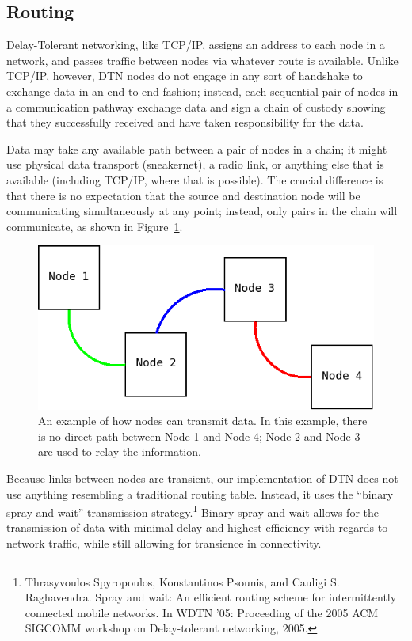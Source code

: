 \documentclass[12pt]{article}
\begin{document}
  \subsection{Routing}
  \label{subsec:routing}
  
    Delay-Tolerant networking, like TCP/IP, assigns an address to each node in a network, and passes traffic between nodes via whatever route is available. Unlike TCP/IP, however, DTN nodes do not engage in any sort of handshake to exchange data in an end-to-end fashion; instead, each sequential pair of nodes in a communication pathway exchange data and sign a chain of custody showing that they successfully received and have taken responsibility for the data.
    
    Data may take any available path between a pair of nodes in a chain; it might use physical data transport (sneakernet), a radio link, or anything else that is available (including TCP/IP, where that is possible). The crucial difference is that there is no expectation that the source and destination node will be communicating simultaneously at any point; instead, only pairs in the chain will communicate, as shown in Figure~\ref{fig:chaincomm}.
    
    \begin{figure}[h]
      \centering
      \includegraphics[scale=0.5]{Diagram1.png}
      \caption{An example of how nodes can transmit data. In this example, there is no direct path between Node 1 and Node 4; Node 2 and Node 3 are used to relay the information.}
      \label{fig:chaincomm}
    \end{figure}
    
    Because links between nodes are transient, our implementation of DTN does not use anything resembling a traditional routing table. Instead, it uses the ``binary spray and wait'' transmission strategy.\footnote{Thrasyvoulos Spyropoulos, Konstantinos Psounis, and Cauligi S. Raghavendra. Spray and wait: An efficient routing scheme for intermittently connected mobile networks. In WDTN '05: Proceeding of the 2005 ACM SIGCOMM workshop on Delay-tolerant networking, 2005.} Binary spray and wait allows for the transmission of data with minimal delay and highest efficiency with regards to network traffic, while still allowing for transience in connectivity.
    
\end{document}
